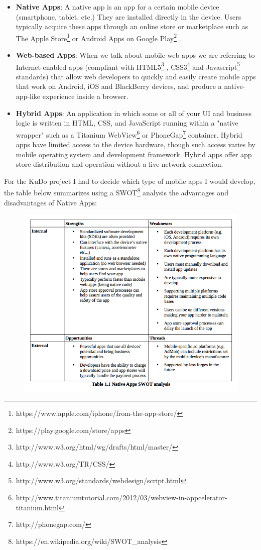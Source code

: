 \documentclass[a4paper,12pt]{book}
\begin{document}
\begin{itemize}
 \item \textbf{Native Apps}: A native app is an app for a certain mobile device (smartphone, tablet, etc.) They are installed directly in the device. Users typically acquire these apps through an online store or marketplace such as The Apple Store\footnote{https://www.apple.com/iphone/from-the-app-store/} or Android Apps on Google Play\footnote{https://play.google.com/store/apps} .
 \item \textbf{Web-based Apps}: When we talk about mobile web apps we are referring to Internet-enabled apps (compliant with HTML5\footnote{http://www.w3.org/html/wg/drafts/html/master/} , CSS3\footnote{http://www.w3.org/TR/CSS/} and Javascript\footnote{http://www.w3.org/standards/webdesign/script.html}  standards) that allow web developers to quickly and easily create mobile apps that work on Android, iOS and BlackBerry devices, and produce a native-app-like experience inside a browser. 
 \item \textbf{Hybrid Apps}: An application in which some or all of your UI and business logic is written in HTML, CSS, and JavaScript running within a "native wrapper" such as a Titanium WebView\footnote{http://www.titaniumtutorial.com/2012/03/webview-in-appcelerator-titanium.html} or PhoneGap\footnote{http://phonegap.com/} container. Hybrid apps have limited access to the device hardware, though such access varies by mobile operating system and development framework. Hybrid apps offer app store distribution and operation without a live network connection.
\end{itemize}

For the KuDo project I had to decide which type of mobile apps I would develop, the table below summarizes using a SWOT\footnote{https://en.wikipedia.org/wiki/SWOT\_analysis} analysis the advantages and disadvantages of Native Apps:

\begin{figure}[H]
    \centering
    \includegraphics[width=12cm, keepaspectratio]{img/table11.png}
 \end{figure}
\end{document}
